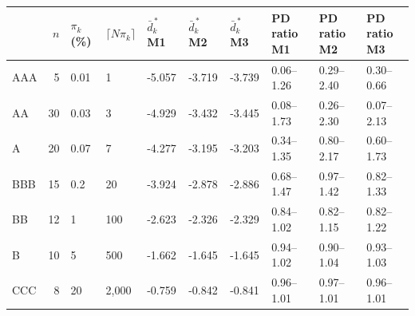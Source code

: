 \begin{tabular}{lrllllllll}
\toprule
 & $n$ & $\pi_k$ (\%) & $\lceil N\pi_k\rceil$ & $\bar d^{\,*}_k$ M1 & $\bar d^{\,*}_k$ M2 & $\bar d^{\,*}_k$ M3 & PD ratio M1 & PD ratio M2 & PD ratio M3 \\
\midrule
AAA & 5 & 0.01 & 1 & -5.057 & -3.719 & -3.739 & 0.06--1.26 & 0.29--2.40 & 0.30--0.66 \\
AA & 30 & 0.03 & 3 & -4.929 & -3.432 & -3.445 & 0.08--1.73 & 0.26--2.30 & 0.07--2.13 \\
A & 20 & 0.07 & 7 & -4.277 & -3.195 & -3.203 & 0.34--1.35 & 0.80--2.17 & 0.60--1.73 \\
BBB & 15 & 0.2 & 20 & -3.924 & -2.878 & -2.886 & 0.68--1.47 & 0.97--1.42 & 0.82--1.33 \\
BB & 12 & 1 & 100 & -2.623 & -2.326 & -2.329 & 0.84--1.02 & 0.82--1.15 & 0.82--1.22 \\
B & 10 & 5 & 500 & -1.662 & -1.645 & -1.645 & 0.94--1.02 & 0.90--1.04 & 0.93--1.03 \\
CCC & 8 & 20 & 2,000 & -0.759 & -0.842 & -0.841 & 0.96--1.01 & 0.97--1.01 & 0.96--1.01 \\
\bottomrule
\end{tabular}
